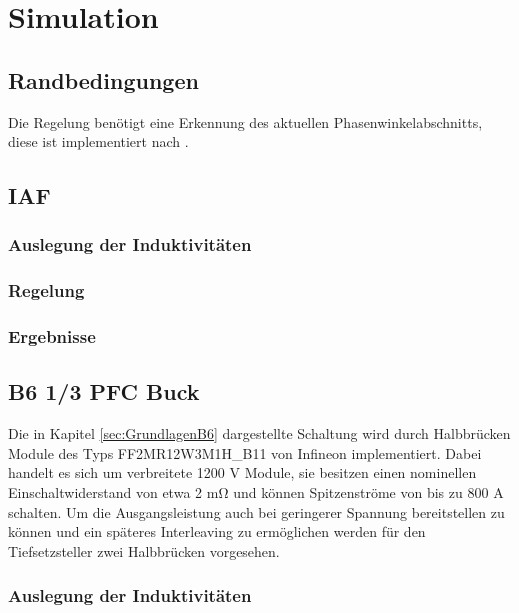 \chapter{Simulation}


\section{Randbedingungen}

Die Regelung benötigt eine Erkennung des aktuellen Phasenwinkelabschnitts, diese ist implementiert nach \cite{InstituteofElectricalandElectronicsEngineers}.

\section{IAF}

\cite{IAF99}

\subsection{Auslegung der Induktivitäten }
\subsection{Regelung}

\subsection{Ergebnisse}


\section{B6 1/3 PFC Buck}
Die in Kapitel \ref{sec:GrundlagenB6} dargestellte Schaltung wird durch Halbbrücken Module des Typs FF2MR12W3M1H\_B11 von Infineon implementiert. Dabei handelt es sich um verbreitete 1200 \si{\volt} Module, sie besitzen einen nominellen Einschaltwiderstand von etwa 2 \si{\milli \ohm} und können Spitzenströme von bis zu 800 \si{\ampere} schalten. Um die Ausgangsleistung auch bei geringerer Spannung bereitstellen zu können und ein späteres Interleaving zu ermöglichen werden für den Tiefsetzsteller zwei Halbbrücken vorgesehen.

\subsection{Auslegung der Induktivitäten }


